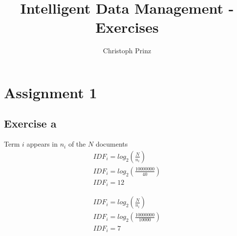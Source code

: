 \documentclass[]{scrartcl}
\title{Intelligent Data Management - Exercises}
\author{Christoph Prinz}
\begin{document}
\maketitle


\section{Assignment 1}

\subsection{Exercise a}

Term $i$ appears in $n_i$ of the $N$ documents \\

\begin{equation}
\begin{split}
IDF_i = log_2(\frac{N}{n_i})\\
IDF_i = log_2(\frac{10000000}{40})\\
IDF_i = 12
\end{split}
\end{equation}

\begin{equation}
\begin{split}
IDF_i = log_2(\frac{N}{n_i})\\
IDF_i = log_2(\frac{10000000}{10000})\\
IDF_i = 7
\end{split}
\end{equation}
\end{document}
